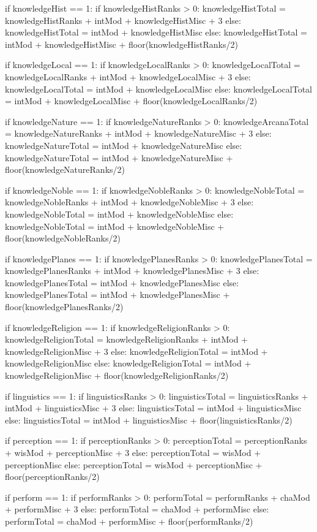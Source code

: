 \begin{python}
if knowledgeHist == 1:
	 if knowledgeHistRanks > 0:
	  knowledgeHistTotal = knowledgeHistRanks + intMod + knowledgeHistMisc + 3
	 else:
	  knowledgeHistTotal = intMod + knowledgeHistMisc
else:
	 knowledgeHistTotal = intMod + knowledgeHistMisc + floor(knowledgeHistRanks/2)

if knowledgeLocal == 1:
	 if knowledgeLocalRanks > 0:
	  knowledgeLocalTotal = knowledgeLocalRanks + intMod + knowledgeLocalMisc + 3
	 else:
	  knowledgeLocalTotal = intMod + knowledgeLocalMisc
else:
	 knowledgeLocalTotal = intMod + knowledgeLocalMisc + floor(knowledgeLocalRanks/2)

if knowledgeNature == 1:
	 if knowledgeNatureRanks > 0:
	  knowledgeArcanaTotal = knowledgeNatureRanks + intMod + knowledgeNatureMisc + 3
	 else:
	  knowledgeNatureTotal = intMod + knowledgeNatureMisc
else:
	 knowledgeNatureTotal = intMod + knowledgeNatureMisc + floor(knowledgeNatureRanks/2)

if knowledgeNoble == 1:
	 if knowledgeNobleRanks > 0:
	  knowledgeNobleTotal = knowledgeNobleRanks + intMod + knowledgeNobleMisc + 3
	 else:
	  knowledgeNobleTotal = intMod + knowledgeNobleMisc
else:
	 knowledgeNobleTotal = intMod + knowledgeNobleMisc + floor(knowledgeNobleRanks/2)

if knowledgePlanes == 1:
	 if knowledgePlanesRanks > 0:
	  knowledgePlanesTotal = knowledgePlanesRanks + intMod + knowledgePlanesMisc + 3
	 else:
	  knowledgePlanesTotal = intMod + knowledgePlanesMisc
else:
	 knowledgePlanesTotal = intMod + knowledgePlanesMisc + floor(knowledgePlanesRanks/2)

if knowledgeReligion == 1:
	 if knowledgeReligionRanks > 0:
	  knowledgeReligionTotal = knowledgeReligionRanks + intMod + knowledgeReligionMisc + 3
	 else:
	  knowledgeReligionTotal = intMod + knowledgeReligionMisc
else:
	 knowledgeReligionTotal = intMod + knowledgeReligionMisc + floor(knowledgeReligionRanks/2)

if linguistics == 1:
	 if linguisticsRanks > 0:
	  linguisticsTotal = linguisticsRanks + intMod + linguisticsMisc + 3
	 else:
	  linguisticsTotal = intMod + linguisticsMisc
else:
	 linguisticsTotal = intMod + linguisticsMisc + floor(linguisticsRanks/2)

if perception == 1:
	 if perceptionRanks > 0:
	  perceptionTotal = perceptionRanks + wisMod + perceptionMisc + 3
	 else:
	  perceptionTotal = wisMod + perceptionMisc
else:
	 perceptionTotal = wisMod + perceptionMisc + floor(perceptionRanks/2)

if perform == 1:
	 if performRanks > 0:
	  performTotal = performRanks + chaMod + performMisc + 3
	 else:
	  performTotal = chaMod + performMisc
else:
	 performTotal = chaMod + performMisc + floor(performRanks/2)


\end{python}
